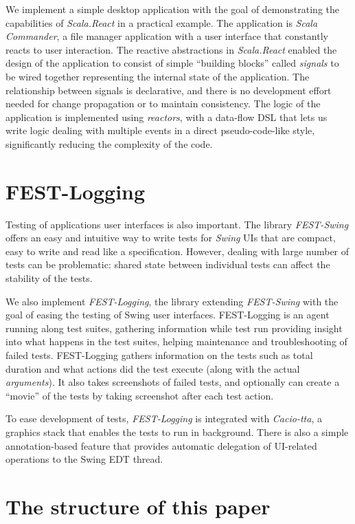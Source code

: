 We implement a simple desktop application with the goal of demonstrating the capabilities of \emph{Scala.React} in a practical example. The application is \emph{Scala Commander}, a file manager application with a user interface that constantly reacts to user interaction. The reactive abstractions in \emph{Scala.React} enabled the design of the application to consist of simple ``building blocks'' called \emph{signals} to be wired together representing the internal state of the application. The relationship between signals is declarative, and there is no development effort needed for change propagation or to maintain consistency. The logic of the application is implemented using \emph{reactors}, with a data-flow DSL that lets us write logic dealing with multiple events in a direct pseudo-code-like style, significantly reducing the complexity of the code.

\section{FEST-Logging}

Testing of applications user interfaces is also important. The library \emph{FEST-Swing} offers an easy and intuitive way to write tests for \emph{Swing} UIs that are compact, easy to write and read like a specification. However, dealing with large number of tests can be problematic: shared state between individual tests can affect the stability of the tests. 

We also implement \emph{FEST-Logging}, the library extending \emph{FEST-Swing} with the goal of easing the testing of Swing user interfaces. FEST-Logging is an agent running along test suites, gathering information while test run providing insight into what happens in the test suites, helping maintenance and troubleshooting of failed tests. FEST-Logging gathers information on the tests such as total duration and what actions did the test execute (along with the actual \emph{arguments}). It also takes screenshots of failed tests, and optionally can create a ``movie'' of the tests by taking screenshot after each test action.

To ease development of tests, \emph{FEST-Logging} is integrated with \emph{Cacio-tta}, a graphics stack that enables the tests to run in background. There is also a simple annotation-based feature that provides automatic delegation of UI-related operations to the Swing EDT thread.

\section{The structure of this paper}

